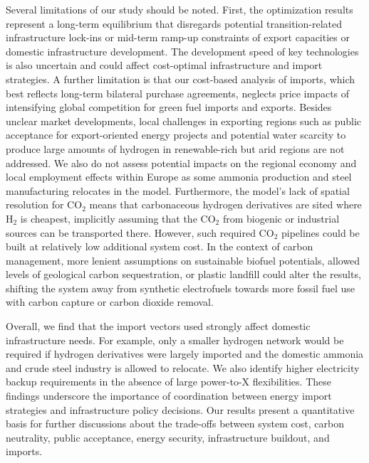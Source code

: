 Several limitations of our study should be noted. First, the optimization
results represent a long-term equilibrium that disregards potential
transition-related infrastructure lock-ins or mid-term ramp-up constraints of
export capacities or domestic infrastructure development. The development speed
of key technologies is also uncertain and could affect cost-optimal
infrastructure and import strategies. A further limitation is that our
cost-based analysis of imports, which best reflects long-term bilateral purchase
agreements, neglects price impacts of intensifying global competition for green
fuel imports and exports.\cite{galimovaGlobalTrading2023a} Besides unclear
market developments, local challenges in exporting regions such as public
acceptance for export-oriented energy projects\cite{ishmamMappingLocalGreen2024}
and potential water
scarcity\cite{franzmannGreenHydrogenCostpotentials2023,terlouwFutureHydrogenEconomies2024}
to produce large amounts of hydrogen in renewable-rich but arid regions are not
addressed. We also do not assess potential impacts on the regional economy and
local employment effects within Europe as some ammonia production and steel manufacturing
relocates in the model. Furthermore, the model's lack of spatial resolution for
CO$_2$ means that carbonaceous hydrogen derivatives are sited where H$_2$ is
cheapest, implicitly assuming that the CO$_2$ from biogenic or industrial
sources can be transported there. However, such required CO$_2$ pipelines could
be built at relatively low additional system cost.\cite{hofmannH2CO2Network2024}
In the context of carbon management, more lenient assumptions on sustainable
biofuel potentials, allowed levels of geological carbon sequestration, or
plastic landfill could alter the results, shifting the system away from
synthetic electrofuels towards more fossil fuel use with carbon capture or
carbon dioxide
removal.\cite{hofmannH2CO2Network2024,millingerDiversityBiomassUsage2023}

Overall, we find that the import vectors used strongly affect domestic
infrastructure needs. For example, only a smaller hydrogen network would be
required if hydrogen derivatives were largely imported and the domestic ammonia
and crude steel industry is allowed to relocate. We also identify higher electricity
backup requirements in the absence of large power-to-X flexibilities. These
findings underscore the importance of coordination between energy import
strategies and infrastructure policy decisions. Our results present a
quantitative basis for further discussions about the trade-offs between system
cost, carbon neutrality, public acceptance, energy security, infrastructure
buildout, and imports.


